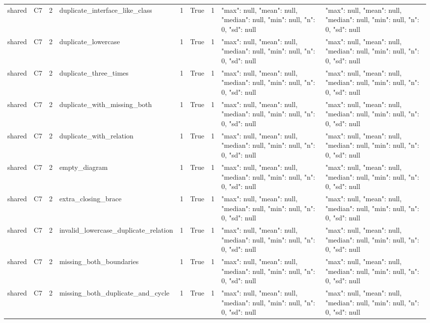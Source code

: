 \begin{tabular}{lllllllll}
shared & C7 & 2 & duplicate\_interface\_like\_class & 1 & True & 1 & {"max": null, "mean": null, "median": null, "min": null, "n": 0, "sd": null} & {"max": null, "mean": null, "median": null, "min": null, "n": 0, "sd": null} \\
shared & C7 & 2 & duplicate\_lowercase & 1 & True & 1 & {"max": null, "mean": null, "median": null, "min": null, "n": 0, "sd": null} & {"max": null, "mean": null, "median": null, "min": null, "n": 0, "sd": null} \\
shared & C7 & 2 & duplicate\_three\_times & 1 & True & 1 & {"max": null, "mean": null, "median": null, "min": null, "n": 0, "sd": null} & {"max": null, "mean": null, "median": null, "min": null, "n": 0, "sd": null} \\
shared & C7 & 2 & duplicate\_with\_missing\_both & 1 & True & 1 & {"max": null, "mean": null, "median": null, "min": null, "n": 0, "sd": null} & {"max": null, "mean": null, "median": null, "min": null, "n": 0, "sd": null} \\
shared & C7 & 2 & duplicate\_with\_relation & 1 & True & 1 & {"max": null, "mean": null, "median": null, "min": null, "n": 0, "sd": null} & {"max": null, "mean": null, "median": null, "min": null, "n": 0, "sd": null} \\
shared & C7 & 2 & empty\_diagram & 1 & True & 1 & {"max": null, "mean": null, "median": null, "min": null, "n": 0, "sd": null} & {"max": null, "mean": null, "median": null, "min": null, "n": 0, "sd": null} \\
shared & C7 & 2 & extra\_closing\_brace & 1 & True & 1 & {"max": null, "mean": null, "median": null, "min": null, "n": 0, "sd": null} & {"max": null, "mean": null, "median": null, "min": null, "n": 0, "sd": null} \\
shared & C7 & 2 & invalid\_lowercase\_duplicate\_relation & 1 & True & 1 & {"max": null, "mean": null, "median": null, "min": null, "n": 0, "sd": null} & {"max": null, "mean": null, "median": null, "min": null, "n": 0, "sd": null} \\
shared & C7 & 2 & missing\_both\_boundaries & 1 & True & 1 & {"max": null, "mean": null, "median": null, "min": null, "n": 0, "sd": null} & {"max": null, "mean": null, "median": null, "min": null, "n": 0, "sd": null} \\
shared & C7 & 2 & missing\_both\_duplicate\_and\_cycle & 1 & True & 1 & {"max": null, "mean": null, "median": null, "min": null, "n": 0, "sd": null} & {"max": null, "mean": null, "median": null, "min": null, "n": 0, "sd": null} \\

\end{tabular}
